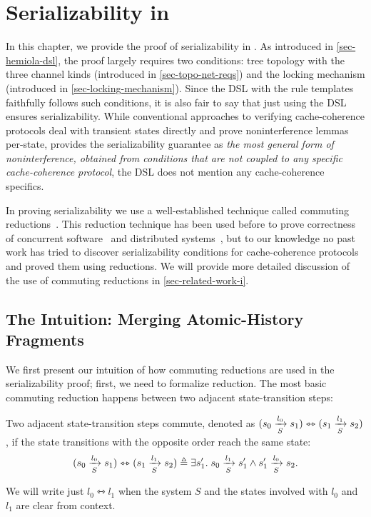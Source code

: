 \chapter{Serializability in \hemiola{}}
\label{sec-sz-guarantee-hemiola}

In this chapter, we provide the proof of serializability in \hemiola{}.
As introduced in \autoref{sec-hemiola-dsl}, the proof largely requires two conditions: tree topology with the three channel kinds (introduced in \autoref{sec-topo-net-reqs}) and the locking mechanism (introduced in \autoref{sec-locking-mechanism}).
Since the \hemiola{} DSL with the rule templates faithfully follows such conditions, it is also fair to say that just using the DSL ensures serializability.
While conventional approaches to verifying cache-coherence protocols deal with transient states directly and prove noninterference lemmas per-state, \hemiola{} provides the serializability guarantee as \emph{the most general form of noninterference, obtained from conditions that are not coupled to any specific cache-coherence protocol}, \eg{} the DSL does not mention any cache-coherence specifics.

In proving serializability we use a well-established technique called commuting reductions~\cite{reduction}.
This reduction technique has been used before to prove correctness of concurrent software~\cite{Hawblitzel:2015,Chajed:2018} and distributed systems~\cite{Hawblitzel:2017}, but to our knowledge no past work has tried to discover serializability conditions for cache-coherence protocols and proved them using reductions.
We will provide more detailed discussion of the use of commuting reductions in \autoref{sec-related-work-i}.

\section{The Intuition: Merging Atomic-History Fragments}
\label{sec-sz-pf-intuition}

\newcommand{\commstep}[2]{\ensuremath{#1 \leftrightarrowtriangle #2}}
\newcommand{\commhst}[2]{\ensuremath{#1 \leftrightarrowtriangle #2}}

We first present our intuition of how commuting reductions are used in the serializability proof; first, we need to formalize reduction.
The most basic commuting reduction happens between two adjacent state-transition steps:
\begin{definition}
  \label{def-comm-steps}
  Two adjacent state-transition steps commute, denoted as \commstep{(\semstep{S}{s_0}{l_0}{s_1})}{(\semstep{S}{s_1}{l_1}{s_2})}, if the state transitions with the opposite order reach the same state:
  \begin{displaymath}
    \commstep{(\semstep{S}{s_0}{l_0}{s_1})}{(\semstep{S}{s_1}{l_1}{s_2})} \triangleq \exists s_1'.\; \semstep{S}{s_0}{l_1}{s_1'} \wedge \semstep{S}{s_1'}{l_0}{s_2}.
  \end{displaymath}
\end{definition}
We will write just $\commstep{l_0}{l_1}$ when the system $S$ and the states involved with $l_0$ and $l_1$ are clear from context.

